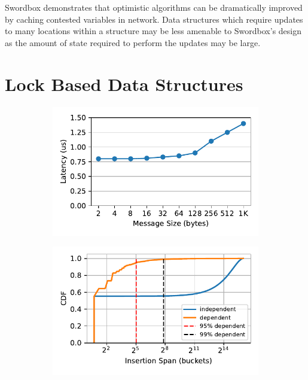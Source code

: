 Swordbox demonstrates that optimistic algorithms can be
dramatically improved by caching contested variables in
network. Data structures which require updates to many
locations within a structure may be less amenable to
Swordbox's design as the amount of state required to perform
the updates may be large.



\section{Lock Based Data Structures}

\begin{figure}[t!]
    \begin{subfigure}{.33\textwidth}
      \centering
      \includegraphics[width=.9\linewidth]{fig/rdma_latency.pdf}
    \end{subfigure}%
    \begin{subfigure}{.33\textwidth}
      \centering
      \includegraphics[width=.9\linewidth]{fig/insertion_span.pdf}

\end{subfigure}
\end{figure}
